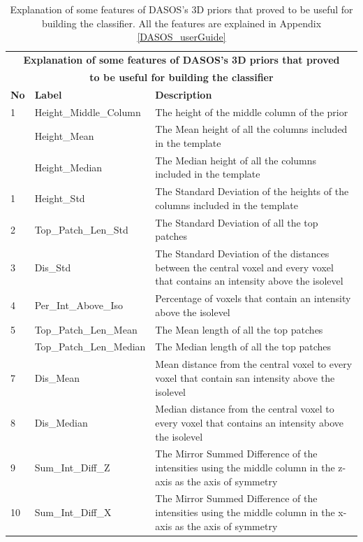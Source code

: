 \documentclass{subfiles}
\begin{document}
\begin{table}[!h]
	\centering
	\begin{tabular}{|p{0.85cm}|p{4.5cm}|p{7.8cm}|}
		\toprule
		\multicolumn{3}{|c|}{\textbf{Explanation of some features of DASOS's 3D priors that proved }}\\ 
		\multicolumn{3}{|c|}{\textbf{to be useful for building the classifier}} \\
		\midrule
		\textbf{No}&\textbf{Label} & \textbf{Description} \\ 
        \hline
		1&Height\_Middle\_Column& The height of the middle column of the prior
		\\
		\hline
		&Height\_Mean& The Mean height of all the columns included in the template\\
		\hline
		&Height\_Median& The Median height of all the columns included in the template
		\\
		\hline
		1 &Height\_Std&The Standard Deviation of the heights of the columns included in the template \\
		\hline
		2&Top\_Patch\_Len\_Std& The Standard Deviation of all the top patches \\
		\hline
		3&Dis\_Std& The Standard Deviation of the distances between the central voxel and every voxel that contains an intensity above the isolevel\\
		\hline
		4&Per\_Int\_Above\_Iso& Percentage of voxels that contain an intensity above the isolevel\\
		\hline
		5&Top\_Patch\_Len\_Mean& The Mean length of all the top patches\\
		\hline
		&Top\_Patch\_Len\_Median& The Median length of all the top patches \\
		\hline
		7&Dis\_Mean& Mean distance from the central voxel to every voxel that contain san intensity above the isolevel  \\
		\hline
		8&Dis\_Median& Median distance from the central voxel to every voxel that contains an intensity above the isolevel \\
		\hline
		9 &Sum\_Int\_Diff\_Z& The Mirror Summed Difference of the intensities using the middle column in the z-axis as the axis of symmetry\\
		\hline
		10 &Sum\_Int\_Diff\_X& The Mirror Summed Difference of the intensities using the middle column in the x-axis as the axis of symmetry \\
		\hline
	\end{tabular}
	\caption{Explanation of some features of DASOS's 3D priors that proved to be useful for building the classifier. All the features are explained in Appendix \ref{DASOS_userGuide}}
	\label{tab:DASOSpriorsExplanationDead}
\end{table}
\end{document}
